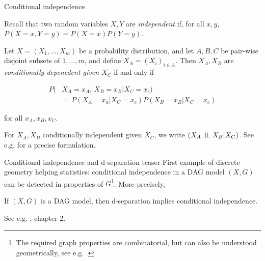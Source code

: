\begin{frame}{Conditional independence}

  Recall that two random variables $X, Y$ are \emph{independent} if, for all $x,y$, $P(X=x, Y=y) = P(X=x) P(Y=y)$.

  \begin{definition}
    Let $X = (X_1, \ldots, X_m)$ be a probability distribution, and let $A, B, C$ be pair-wise disjoint subsets of ${1, \ldots, m}$, and define $X_A = (X_i)_{i \in A}$. Then $X_A, X_B$ are \emph{conditionally depenedent given $X_C$} if and only if

    \begin{align*}
      P(&X_A = x_A,  \,X_B = x_B | X_C = x_c) \\
      &= P(X_A = x_a | X_C = x_c) P(X_B = x_B | X_C = x_c)
    \end{align*}

    for all $x_A, x_B, x_C$.\newline
  \end{definition}

  For $X_A, X_B$ conditionally independent given $X_C$, we write $(X_A \perp\!\!\!\perp X_B | X_C)$. See e.g. \cite{drton2008lectures} for a precise formulation.
\end{frame}

\begin{frame}{Conditional independence and d-separation teaser}
  First example of discrete geometry helping statistics: conditional independence in a DAG model $(X, G)$ can be detected in properties of $G$\footnote{The required graph properties are combinatorial, but can also be understood geometrically, see e.g. \cite{drton2008lectures}.}. More precisely,

  \begin{theorem}
    If $(X, G)$ is a DAG model, then d-separation implies conditional independence.
  \end{theorem}
  See e.g. \cite{pearl2016causal}, chapter 2.
\end{frame}


